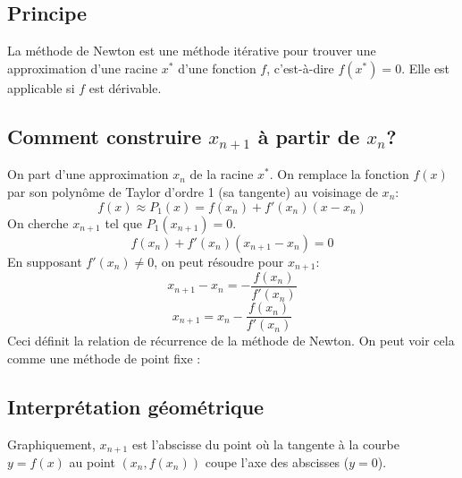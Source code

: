 \subsection{Principe}
\label{ssec:newton_principe}
La méthode de Newton est une méthode itérative pour trouver une approximation d'une racine $x^*$ d'une fonction $f$, c'est-à-dire $f(x^*) = 0$. Elle est applicable si $f$ est dérivable.

\subsection{Comment construire $x_{n+1}$ à partir de $x_n$?}
\label{ssec:newton_construction}
On part d'une approximation $x_n$ de la racine $x^*$. On remplace la fonction $f(x)$ par son polynôme de Taylor d'ordre 1 (sa tangente) au voisinage de $x_n$:
$$ f(x) \approx P_1(x) = f(x_n) + f'(x_n)(x - x_n) $$
On cherche $x_{n+1}$ tel que $P_1(x_{n+1}) = 0$.
$$ f(x_n) + f'(x_n)(x_{n+1} - x_n) = 0 $$
En supposant $f'(x_n) \neq 0$, on peut résoudre pour $x_{n+1}$:
$$ x_{n+1} - x_n = - \frac{f(x_n)}{f'(x_n)} $$
$$ x_{n+1} = x_n - \frac{f(x_n)}{f'(x_n)} $$
Ceci définit la relation de récurrence de la méthode de Newton.
On peut voir cela comme une méthode de point fixe :
\begin{center}
\end{center}

\subsection{Interprétation géométrique}
\label{ssec:newton_interpretation_geometrique}
Graphiquement, $x_{n+1}$ est l'abscisse du point où la tangente à la courbe $y=f(x)$ au point $(x_n, f(x_n))$ coupe l'axe des abscisses ($y=0$).


